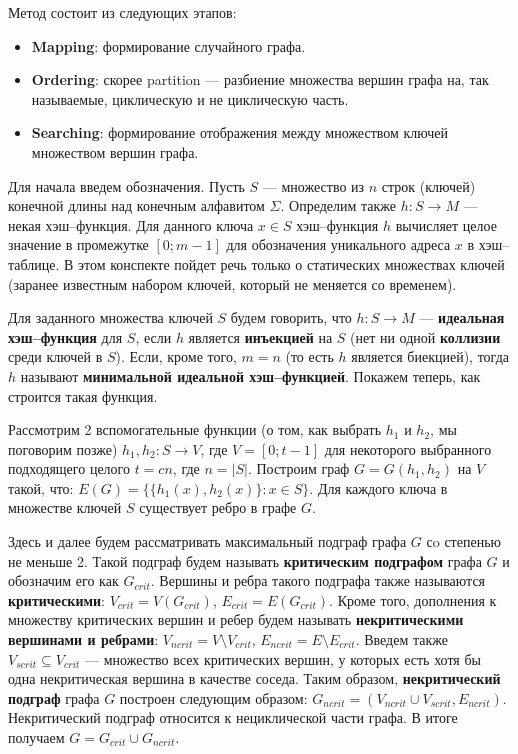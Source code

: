 \documentclass[specialist,
               substylefile = spbu.rtx,
               subf,href,colorlinks=true, 12pt]{disser}
\begin{document}
Метод состоит из следующих этапов:

\begin{itemize}
\item \textbf{Mapping}: формирование случайного графа.
\item \textbf{Ordering}: скорее partition --- разбиение множества вершин графа на, так называемые, циклическую и не циклическую часть.
\item \textbf{Searching}: формирование отображения между множеством ключей множеством вершин графа.
\end{itemize}

Для начала введем обозначения. Пусть $S$ --- множество из $n$ строк (ключей) конечной длины над конечным алфавитом $\Sigma$.
Определим также $h: S \longrightarrow M$ ---  некая хэш--функция. Для данного ключа $x \in S$ хэш--функция $h$ вычисляет целое значение в промежутке $[0;m-1]$ для обозначения уникального адреса  $x$ в хэш--таблице. В этом конспекте пойдет речь только о статических множествах ключей (заранее известным набором ключей, который не меняется со временем).

Для заданного множества ключей $S$ будем говорить, что $h: S \longrightarrow M$ --- \textbf{идеальная хэш--функция} для $S$, если $h$ является \textbf{инъекцией} на $S$ (нет ни одной \textbf{коллизии} среди ключей в $S$). Если, кроме того, $m = n$ (то есть $h$ является биекцией), тогда $h$ называют \textbf{минимальной идеальной хэш--функцией}. Покажем теперь, как строится такая функция.

Рассмотрим 2 вспомогательные функции (о том, как выбрать $h_1$ и $h_2$, мы поговорим позже) $h_1, h_2 : S \longrightarrow V$, где $V = [0; t-1]$ для некоторого выбранного подходящего целого $t = cn$, где $n = |S|$. Построим граф $G = G(h_1, h_2)$ на $V$ такой, что: $E(G) = \{\{h_1(x),h_2(x)\}: x \in S\}$. Для каждого ключа в множестве ключей $S$ существует ребро в графе $G$.

Здесь и далее будем рассматривать максимальный подграф графа $G$ сo степенью не меньше 2. Такой подграф будем называть \textbf{критическим подграфом} графа $G$ и обозначим его как $G_{crit}$. Вершины и ребра такого подграфа также называются \textbf{критическими}: $V_{crit} = V(G_{crit})$, $E_{crit} = E(G_{crit})$. Кроме того, дополнения к множеству критических вершин и ребер будем называть \textbf{некритическими вершинами и ребрами}: $V_{ncrit} = V \setminus V_{crit}$, $E_{ncrit} = E \setminus E_{crit}$. Введем также $V_{scrit} \subseteq V_{crit}$ --- множество всех критических вершин, у которых есть хотя бы одна некритическая вершина в качестве соседа. Таким образом, \textbf{некритический подграф} графа $G$ построен следующим образом: $G_{ncrit} = (V_{ncrit} \cup V_{scrit}, E_{ncrit})$. Некритический подграф относится к нециклической части графа. В итоге получаем $G = G_{crit} \cup G_{ncrit}$.
\end{document}
